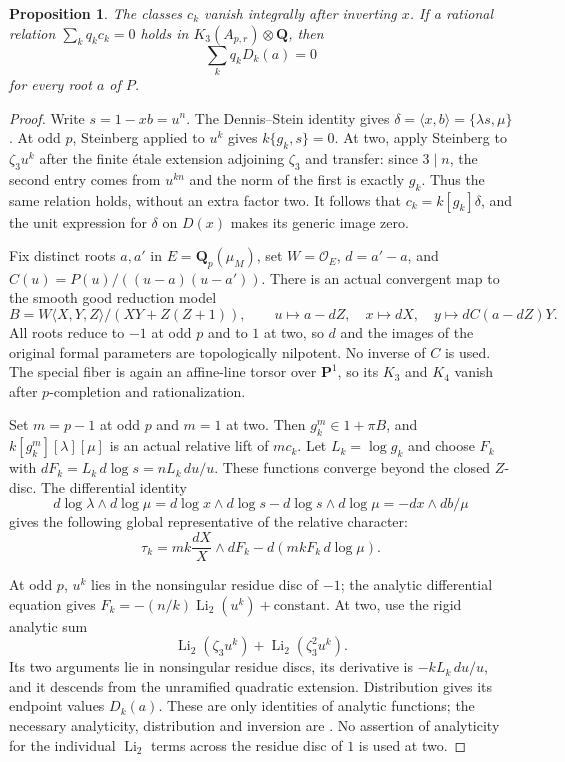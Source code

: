\documentclass[11pt,a4paper]{amsart}
\numberwithin{equation}{section}
\newtheorem{proposition}[theorem]{Proposition}
\theoremstyle{definition}
\theoremstyle{remark}
\begin{document}
\begin{proposition}
\label{d3:prop:directtcendpoints}
The classes $c_k$ vanish integrally after inverting $x$.
If a rational relation $\sum_k q_kc_k=0$ holds in
$K_3(A_{p,r})\otimes\mathbf Q$, then
\[
       \sum_k q_kD_k(a)=0
\]
for every root $a$ of $P$.
\end{proposition}
\begin{proof}
Write $s=1-xb=u^n$. The Dennis--Stein identity gives
$\delta=\langle x,b\rangle=\{\lambda s,\mu\}$.
At odd $p$, Steinberg applied to $u^k$ gives $k\{g_k,s\}=0$.
At two, apply Steinberg to $\zeta_3u^k$ after the finite \'etale
extension adjoining $\zeta_3$ and transfer: since $3\mid n$, the
second entry comes from $u^{kn}$ and the norm of the first is exactly
$g_k$. Thus the same relation holds, without an extra factor two.
It follows that $c_k=k[g_k]\delta$, and the unit expression for
$\delta$ on $D(x)$ makes its generic image zero.

Fix distinct roots $a,a'$ in $E=\mathbf Q_p(\mu_M)$, set
$W=\mathcal O_E$, $d=a'-a$, and
$C(u)=P(u)/((u-a)(u-a'))$. There is an actual convergent map to the
smooth good reduction model
\[
 B=W\langle X,Y,Z\rangle/(XY+Z(Z+1)),\qquad
 u\mapsto a-dZ,\quad x\mapsto dX,\quad
 y\mapsto dC(a-dZ)Y.
\]
All roots reduce to $-1$ at odd $p$ and to $1$ at two, so $d$ and
the images of the original formal parameters are topologically
nilpotent. No inverse of $C$ is used. The special fiber is again an
affine-line torsor over $\mathbf P^1$, so its $K_3$ and $K_4$
vanish after $p$-completion and rationalization.

Set $m=p-1$ at odd $p$ and $m=1$ at two. Then $g_k^m\in1+\pi B$,
and $k[g_k^m][\lambda][\mu]$ is an actual relative lift of $mc_k$.
Let $L_k=\log g_k$ and choose $F_k$ with
$dF_k=L_k\,d\log s=nL_k\,du/u$. These functions converge beyond
the closed $Z$-disc. The differential identity
\[
 d\log\lambda\wedge d\log\mu
 =d\log x\wedge d\log s-d\log s\wedge d\log\mu
 =-dx\wedge db/\mu
\]
gives the following global representative of the relative character:
\[
 \tau_k=mk\frac{dX}{X}\wedge dF_k
                         -d(mkF_k\,d\log\mu).
\]

At odd $p$, $u^k$ lies in the nonsingular residue disc of $-1$;
the analytic differential equation gives
$F_k=-(n/k)\operatorname{Li}_2(u^k)+\mathrm{constant}$.
At two, use the rigid analytic sum
\[
 \operatorname{Li}_2(\zeta_3u^k)+
                   \operatorname{Li}_2(\zeta_3^2u^k).
\]
Its two arguments lie in nonsingular residue discs, its derivative is
$-kL_k\,du/u$, and it descends from the unramified quadratic
extension. Distribution gives its endpoint values $D_k(a)$.
These are only identities of analytic functions; the necessary
analyticity, distribution and inversion are
\cite[Theorem~2.7(1), Proposition~4.4, Proposition~2.10]{BesserDeJeuAlgorithm}.
No assertion of analyticity for the individual $\operatorname{Li}_2$
terms across the residue disc of $1$ is used at two.


\end{proof}
\end{document}
